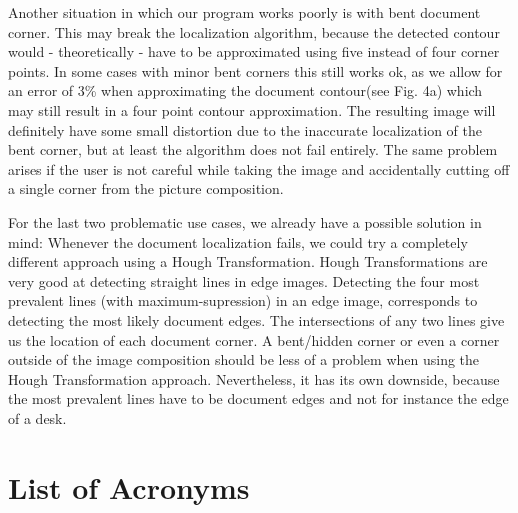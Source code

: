 \documentclass[bibliography=totoc]{scrartcl}
\begin{document}
	Another situation in which our program works poorly is with bent document corner. 
	This may break the localization algorithm, because the detected contour would - theoretically - have to be approximated using five instead of four corner points.
	In some cases with minor bent corners this still works ok, as we allow for an error of 3\% when approximating the document contour(see Fig. 4a) which may still result in a four point contour approximation. 
	The resulting image will definitely have some small distortion due to the inaccurate localization of the bent corner, but at least the algorithm does not fail entirely.
	The same problem arises if the user is not careful while taking the image and accidentally cutting off a single corner from the picture composition.
	
	For the last two problematic use cases, we already have a possible solution in mind: 
	Whenever the document localization fails, we could try a completely different approach using a Hough Transformation. 
	Hough Transformations are very good at detecting straight lines in edge images. 
	Detecting the four most prevalent lines (with maximum-supression) in an edge image, corresponds to detecting the most likely document edges.
	The intersections of any two lines give us the location of each document corner. 
	A bent/hidden corner or even a corner outside of the image composition should be less of a problem when using the Hough Transformation approach.
	Nevertheless, it has its own downside, because the most prevalent lines have to be document edges and not for instance the edge of a desk.


\section*{List of Acronyms} 

\begin{acronym}[....]
\end{acronym}
			

\end{document}
